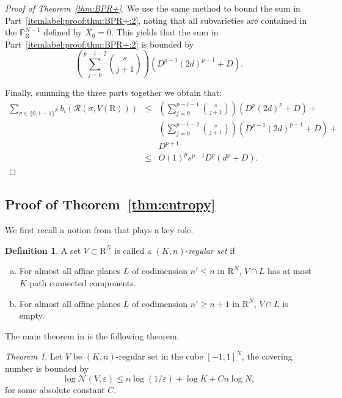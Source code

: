 \documentclass[10pt]{amsart}
\theoremstyle{definition}
\newtheorem{definition}{Definition}[section]
\theoremstyle{remark}
\newtheorem{thmx}{Theorem}
\numberwithin{equation}{section}
\newcommand {\R} {\mathrm{R}}
\newcommand {\RR} {{\mathcal R}}
\newcommand {\PP}     {\mathbb{P}} %
\begin{document}
\begin{proof}[Proof of Theorem~\ref{thm:BPR+}]
We use the same method to bound the sum in Part~\eqref{itemlabel:proof:thm:BPR+:2}, noting that all subvarieties are
contained in the $\PP_\R^{N-1}$ defined by $X_0=0$. This yields that the
sum in Part~\eqref{itemlabel:proof:thm:BPR+:2} is bounded by 
\[
\left(\sum_{j=0}^{p-i-2} \binom{s}{j+1}\right)(D^{p-1}(2d)^{p-1} + D).
\]

Finally, summing the three parts together we obtain that:
\begin{eqnarray*}
\sum_{\sigma \in \{0,1-1\}^{\mathcal{P}}} b_i(\RR(\sigma,V(\R))) &\leq& 
 \left(\sum_{j=0}^{p-i-1} \binom{s}{j+1}\right)(D^p(2d)^{p} + D) + \\
&& \left(\sum_{j=0}^{p-i-2} \binom{s}{j+1}\right)(D^{p-1}(2d)^{p-1} + D) + \\
&&
D^{p+1} \\
&\leq& O(1)^p s^{p-i} D^p(d^p + D).
\end{eqnarray*}
\end{proof}




\subsection{Proof of Theorem~\ref{thm:entropy}}
We first recall a notion from \cite{Zhang-Kileel2023} that plays a key role.

\begin{definition}
\label{def:reg_set_informal}
    A set $V \subset \R^N$ is called a $(K, n)$-\emph{regular set} if
    \begin{enumerate}[(a)]
        \item For almost all affine planes $L$ of codimension $n' \leq n$ in $\R^N$, $V \cap L$ has at most $K$ path connected components. 
        \item For almost all affine planes $L$ of codimension $n' \geq n+1$ in $\R^N$, $V \cap L$ is empty.
    \end{enumerate}
\end{definition}

The main theorem in \cite{Zhang-Kileel2023} is the following theorem.

\begin{thmx}
Let $V$ be $(K, n)$-regular set in the cube $[-1, 1]^N$, the covering number is bounded by
\begin{equation}\label{eq:main-bound}
    \log\mathcal{N}(V, \varepsilon) \leq n \log(1/\varepsilon) + \log K + C n \log N,
\end{equation}
for some absolute constant $C$.
\end{thmx}
\end{document}
